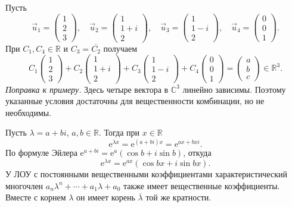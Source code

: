 \documentclass[12pt,a4paper]{article}
\numberwithin{equation}{section}
\newcommand{\R}{\mathbb{R}}
\newcommand{\vect}[1]{\vec{#1}}
\newcommand{\e}{\mathrm{e}}
\begin{document}
\begin{exampleHSE}
Пусть
\[
 \vect u_1=\begin{pmatrix}1\\2\\3\end{pmatrix},\quad
 \vect u_2=\begin{pmatrix}1\\1+i\\2\end{pmatrix},\quad
 \vect u_3=\begin{pmatrix}1\\1-i\\2\end{pmatrix},\quad
 \vect u_4=\begin{pmatrix}0\\0\\1\end{pmatrix}.
\]
При \(C_1,C_4\in\R\) и \(C_3=\overline{C_2}\) получаем
\[
 C_1\begin{pmatrix}1\\2\\3\end{pmatrix}
 +C_2\begin{pmatrix}1\\1+i\\2\end{pmatrix}
 +C_3\begin{pmatrix}1\\1-i\\2\end{pmatrix}
 +C_4\begin{pmatrix}0\\0\\1\end{pmatrix}
 =\begin{pmatrix}a\\b\\c\end{pmatrix}\in\R^3.
\]
\emph{Поправка к примеру.} Здесь четыре вектора в \(\mathbb C^3\)
линейно зависимы. Поэтому указанные условия достаточны для вещественности
комбинации, но не необходимы.
\end{exampleHSE}

Пусть \(\lambda=a+bi\), \(a,b\in\R\). Тогда при \(x\in\R\)
\[
 \e^{\lambda x}=\e^{(a+bi)x}=\e^{ax+bxi}.
\]
По формуле Эйлера \(\e^{a+bi}=\e^a(\cos b+i\sin b)\), откуда
\[
 \e^{\lambda x}=\e^{ax}(\cos bx+i\sin bx).
\]
У ЛОУ с постоянными вещественными коэффициентами характеристический
многочлен \(a_n\lambda^n+\cdots+a_1\lambda+a_0\) также имеет
вещественные коэффициенты. Вместе с корнем \(\lambda\) он имеет корень
\(\overline\lambda\) той же кратности.
\end{document}
